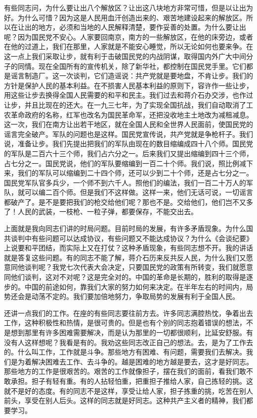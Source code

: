 有些同志问，为什么要让出八个解放区？让出这八块地方非常可惜，但是以让出为好。为什么可惜？因为这是人民用血汗创造出来的、艰苦地建设起来的解放区。所以在让出的地方，必须和当地的人民解释清楚，要作妥善的处置。为什么要让出呢？因为国民党不安心。人家要回南京，南方的一些解放区，在他的床旁边，或者在他的过道上，我们在那里，人家就是不能安心睡觉，所以无论如何也要来争。在这一点上我们采取让步，就有利于击破国民党的内战阴谋，取得国内外广大中间分子的同情。现在全国所有的宣传机关，除了新华社，都控制在国民党手里。它们都是谣言制造厂。这一次谈判，它们造谣说：共产党就是要地盘，不肯让步。我们的方针是保护人民的基本利益。在不损害人民基本利益的原则下，容许作一些让步，用这些让步去换得全国人民需要的和平和民主。我们过去和蒋介石办交涉，也作过让步，并且比现在的还大。在一九三七年，为了实现全国抗战，我们自动取消了工农革命政府的名称，红军也改名为国民革命军，还把没收地主土地改为减租减息。这一次，我们在南方让出若干地区，就在全国人民和全世界人民面前，使国民党的谣言完全破产。军队的问题也是这样。国民党宣传说，共产党就是争枪杆子。我们说，准备让步。我们先提出把我们的军队由现在的数目缩编成四十八个师。国民党的军队是二百六十三个师，我们占六分之一。后来我们又提出缩编到四十三个师，占七分之一。国民党说，他们的军队要缩编到一百二十个师。我们说，照比例减下来，我们的军队可以缩编到二十四个师，还可以少到二十个师，还是占七分之一。国民党军队官多兵少，一个师不到六千人。照他们的编法，我们一百二十万人的军队，就可以编二百个师。但是我们不这样做。这样一来，他们无话可说，一切谣言都破产了。是不是要把我们的枪交给他们呢？那也不是。交给他们，他们岂不又多了！人民的武装，一枝枪、一粒子弹，都要保存，不能交出去。

上面就是我向同志们讲的时局问题。目前时局的发展，有许多矛盾现象。为什么国共谈判中有些问题可以达成协议，有些问题又不能达成协议？为什么《会谈纪要》上说要和平团结，而实际上又在打仗？这种矛盾现象，有些同志想不开。我的讲话就是答复这些问题。有的同志不能了解，蒋介石历来反共反人民，为什么我们又愿意同他谈判呢？我党七次代表大会决定，只要国民党的政策有所转变，我们就愿意同他们谈判，这对不对呢？这是完全对的。中国的革命是长期的，胜利的取得是逐步的。中国的前途如何，靠我们大家的努力如何来决定。在半年左右的时间内，局势还会是动荡不定的。我们要加倍地努力，争取局势的发展有利于全国人民。

还讲一点我们的工作。在座的有些同志要往前方去。许多同志满腔热忱，争着出去工作，这种积极性和热情，是很可贵的。但是也有个别的同志抱着错误的想法，不是想到那里有许多困难需要解决，而是认为那里的一切都很顺利，比延安舒服。有没有人这样想呢？我看是有的。我劝这些同志改正自己的想法。去，是为了工作去的。什么叫工作，工作就是斗争。那些地方有困难、有问题，需要我们去解决。我们是为着解决困难去工作、去斗争的。越是困难的地方越是要去，这才是好同志。那些地方的工作是很艰苦的。艰苦的工作就像担子，摆在我们的面前，看我们敢不敢承担。担子有轻有重。有的人拈轻怕重，把重担子推给人家，自己拣轻的挑。这就不是好的态度。有的同志不是这样，享受让给人家，担子拣重的挑，吃苦在别人前头，享受在别人后头。这样的同志就是好同志。这种共产主义者的精神，我们都要学习。

